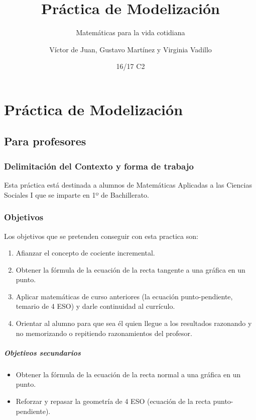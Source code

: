 \documentclass[palatino]{apuntesURJC}
\title{Práctica de Modelización}
\subtitle{Matemáticas para la vida cotidiana}
\author{Víctor de Juan, Gustavo Martínez y Virginia Vadillo}
\date{16/17 C2}
\begin{document}
\maketitle

\chapter{Práctica de Modelización}

\section{Para profesores}

\subsection{Delimitación del Contexto y forma de trabajo}
Esta práctica está destinada a alumnos de Matemáticas Aplicadas a las Ciencias Sociales I que se imparte en 1º de Bachillerato.

\subsection{Objetivos}

Los objetivos que se pretenden conseguir con esta practica son:
\begin{enumerate}
	\item Afianzar el concepto de cociente incremental.
	\item Obtener la fórmula de la ecuación de la recta tangente a una gráfica en un punto.
	\item Aplicar matemáticas de curso anteriores (la ecuación punto-pendiente, temario de 4 ESO) y darle continuidad al currículo.
	\item Orientar al alumno para que sea él quien llegue a los resultados razonando y no memorizando o repitiendo razonamientos del profesor.
\end{enumerate}

\paragraph{Objetivos secundarios}
\begin{itemize}
	\item Obtener la fórmula de la ecuación de la recta normal a una gráfica en un punto.
	\item Reforzar y repasar la geometría de 4 ESO (ecuación de la recta punto-pendiente).
\end{itemize}
\end{document}
